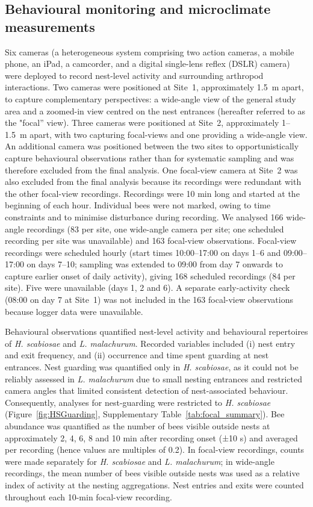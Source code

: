 \documentclass[11pt,a4paper]{article}
\begin{document}
\subsection{Behavioural monitoring and microclimate measurements}

Six cameras (a heterogeneous system comprising two action cameras, a mobile phone, an iPad, a camcorder, and a digital single-lens reflex (DSLR) camera) were deployed to record nest-level activity and surrounding arthropod interactions. Two cameras were positioned at Site~1, approximately 1.5~m apart, to capture complementary perspectives: a wide-angle view of the general study area and a zoomed-in view centred on the nest entrances (hereafter referred to as the "focal'' view). Three cameras were positioned at Site~2, approximately 1--1.5~m apart, with two capturing focal-views and one providing a wide-angle view. An additional camera was positioned between the two sites to opportunistically capture behavioural observations rather than for systematic sampling and was therefore excluded from the final analysis. One focal-view camera at Site~2 was also excluded from the final analysis because its recordings were redundant with the other focal-view recordings. Recordings were 10 min long and started at the beginning of each hour. Individual bees were not marked, owing to time constraints and to minimise disturbance during recording. We analysed 166 wide-angle recordings (83 per site, one wide-angle camera per site; one scheduled recording per site was unavailable) and 163 focal-view observations. Focal-view recordings were scheduled hourly (start times 10:00--17:00 on days 1--6 and 09:00--17:00 on days 7--10; sampling was extended to 09:00 from day 7 onwards to capture earlier onset of daily activity), giving 168 scheduled recordings (84 per site). Five were unavailable (days 1, 2 and 6). A separate early-activity check (08:00 on day 7 at Site~1) was not included in the 163 focal-view observations because logger data were unavailable.

Behavioural observations quantified nest-level activity and behavioural repertoires of \textit{H. scabiosae} and \textit{L. malachurum}. Recorded variables included (i) nest entry and exit frequency, and (ii) occurrence and time spent guarding at nest entrances. Nest guarding was quantified only in \textit{H. scabiosae}, as it could not be reliably assessed in \textit{L. malachurum} due to small nesting entrances and restricted camera angles that limited consistent detection of nest-associated behaviour. Consequently, analyses for nest-guarding were restricted to \textit{H. scabiosae} (Figure~\ref{fig:HSGuarding}, Supplementary Table~\ref{tab:focal_summary}). Bee abundance was quantified as the number of bees visible outside nests at approximately 2, 4, 6, 8 and 10 min after recording onset (±10 s) and averaged per recording (hence values are multiples of 0.2). In focal-view recordings, counts were made separately for \textit{H. scabiosae} and \textit{L. malachurum}; in wide-angle recordings, the mean number of bees visible outside nests was used as a relative index of activity at the nesting aggregations. Nest entries and exits were counted throughout each 10-min focal-view recording.
\end{document}
